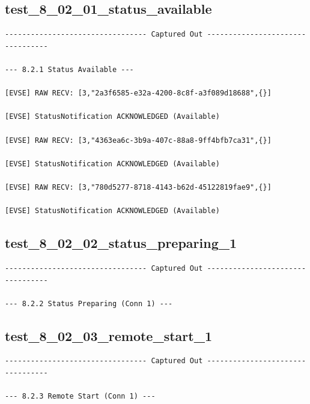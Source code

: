 \documentclass{article}
\begin{document}
\subsection*{test\_8\_02\_01\_status\_available}
\begin{lstlisting}
--------------------------------- Captured Out ---------------------------------

--- 8.2.1 Status Available ---

[EVSE] RAW RECV: [3,"2a3f6585-e32a-4200-8c8f-a3f089d18688",{}]

[EVSE] StatusNotification ACKNOWLEDGED (Available)

[EVSE] RAW RECV: [3,"4363ea6c-3b9a-407c-88a8-9ff4bfb7ca31",{}]

[EVSE] StatusNotification ACKNOWLEDGED (Available)

[EVSE] RAW RECV: [3,"780d5277-8718-4143-b62d-45122819fae9",{}]

[EVSE] StatusNotification ACKNOWLEDGED (Available)
\end{lstlisting}
\subsection*{test\_8\_02\_02\_status\_preparing\_1}
\begin{lstlisting}
--------------------------------- Captured Out ---------------------------------

--- 8.2.2 Status Preparing (Conn 1) ---
\end{lstlisting}
\subsection*{test\_8\_02\_03\_remote\_start\_1}
\begin{lstlisting}
--------------------------------- Captured Out ---------------------------------

--- 8.2.3 Remote Start (Conn 1) ---
\end{lstlisting}
\end{document}
